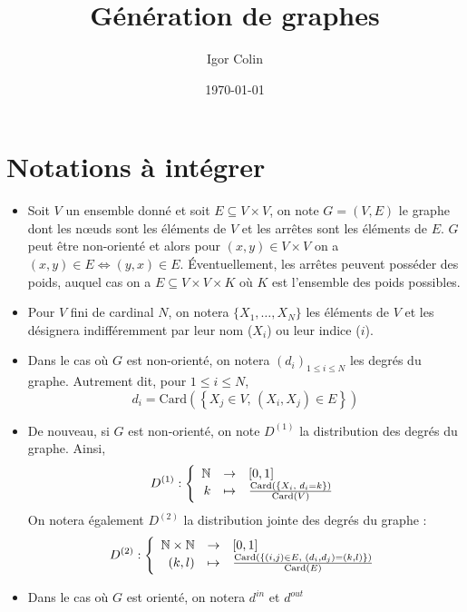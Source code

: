 \documentclass[a4paper]{article}
\title{Génération de graphes}
\author{Igor Colin}
\date{\today}
\newcommand{\tq}{\text{, }}
\newcommand{\card}[1]{\mathrm{Card}\left( #1 \right)}
\begin{document}
\section*{Notations à intégrer}

\begin{itemize}
    \item Soit $V$ un ensemble donné et soit $E \subseteq V \times V$, on note
        $G = (V, E)$ le graphe dont les n\oe{}uds sont les éléments de $V$
        et les arrêtes sont les éléments de $E$. $G$ peut être non-orienté et
        alors pour $(x, y) \in V \times V$ on a
        $(x, y) \in E \Leftrightarrow (y, x) \in E$. \'Eventuellement, les
        arrêtes peuvent posséder des poids, auquel cas on a
        $E \subseteq V \times V \times K$ où $K$ est l'ensemble des poids
        possibles.
    \item Pour $V$ fini de cardinal $N$, on notera $\{X_1, \ldots, X_N\}$
        les éléments de $V$ et les désignera indifféremment par leur nom
        ($X_i$) ou leur indice ($i$).
    \item Dans le cas où $G$ est non-orienté, on notera $(d_i)_{1 \leq i \leq N}$
        les degrés du graphe. Autrement dit, pour $1 \leq i \leq N$,
        \[
            d_i =
            \mathrm{Card}\left( \left\{
                X_j \in V \tq (X_i, X_j) \in E
            \right\} \right)
        \]
    \item De nouveau, si $G$ est non-orienté, on note $D^{(1)}$ la distribution
        des degrés du graphe. Ainsi,
        \[
            D^{(1)}: \left\{
                \begin{array}{r c l}
                    \mathbb{N} & \rightarrow & [0, 1] \\
                    k & \mapsto & \frac{\card{\left\{ X_i \tq d_i = k \right\}}}{\card{V}}
                \end{array}
            \right.
        \]
        On notera également $D^{(2)}$ la distribution jointe des degrés du
        graphe :
        \[
            D^{(2)}: \left\{
                \begin{array}{r c l}
                    \mathbb{N} \times \mathbb{N} & \rightarrow & [0, 1] \\
                    (k, l) & \mapsto &
                    \frac{\card{ \left\{ (i, j) \in E \tq (d_i, d_j) = (k, l) \right\}}}{\card{E}}
                \end{array}
            \right.
        \]
    \item Dans le cas où $G$ est orienté, on notera $d^{in}$ et $d^{out}$

\end{itemize}
\end{document}
